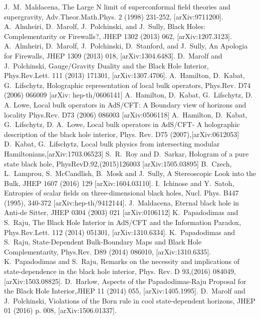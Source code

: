 \documentclass[11pt,a4paper]{article}
\begin{document}
\begin{thebibliography}{}
J.~M.~Maldacena, The Large N limit of superconformal field theories and supergravity, Adv.Theor.Math.Phys. 2 (1998) 231-252, [arXiv:9711200].
A.~Almheiri, D.~Marolf, J.~Polchinski, and J.~Sully, Black Holes: Complementarity or Firewalls?, JHEP 1302 (2013) 062, [arXiv:1207.3123].
A.~Almheiri, D.~Marolf, J.~Polchinski, D.~Stanford, and J.~Sully, An Apologia for Firewalls, JHEP 1309 (2013) 018, [arXiv:1304.6483].
D.~Marolf and J.~Polchinski, Gauge/Gravity Duality and the Black Hole Interior, Phys.Rev.Lett. 111 (2013) 171301, [arXiv:1307.4706].
A.~Hamilton, D.~Kabat, G.~Lifschytz, Holographic representation of local bulk operators, Phys.Rev. D74 (2006) 066009 [arXiv: hep-th/0606141]
 A.~Hamilton, D.~Kabat, G.~Lifschytz, D. A. Lowe, Local bulk operators in AdS/CFT: A Boundary view of horizons and locality Phys.Rev. D73 (2006) 086003 [arXiv:0506118]
A.~Hamilton, D.~Kabat, G.~Lifschytz, D. A.~Lowe, Local bulk operators in AdS/CFT- A holographic description of the black hole interior, Phys. Rev. D75 (2007),[arXiv:0612053]
D.~Kabat, G.~Lifschytz, Local bulk physics from intersecting modular Hamiltonians,[arXiv:1703.06523]
S.~R.~Roy and D.~Sarkar, Hologram of a pure state black hole, PhysRevD.92,(2015)126003 [arXiv:1505.03895]
B.~Czech, L.~Lamprou, S.~McCandlish, B.~Mosk and J.~Sully, A Stereoscopic Look into the Bulk, JHEP 1607 (2016) 129 [arXiv:1604.03110].
I.~Ichinose and Y.~Satoh, Entropies of scalar fields on three-dimensional black holes, Nucl. Phys. B447 (1995), 340-372 [arXiv:hep-th/9412144].
J.~Maldacena, Eternal black hole in Anti-de Sitter,
JHEP 0304 (2003) 021 [arXiv:0106112]
K.~Papadodimas and S.~Raju, The Black Hole Interior in AdS/CFT and the Information Paradox, Phys.Rev.Lett. 112 (2014) 051301, [arXiv:1310.6334].
K.~Papadodimas and S.~Raju, State-Dependent Bulk-Boundary Maps and Black Hole Complementarity, Phys.Rev. D89 (2014) 086010, [arXiv:1310.6335].
K.~Papadodimas and S.~Raju, Remarks on the necessity and implications of state-dependence in the black hole interior, Phys. Rev. D 93,(2016) 084049, [arXiv:1503.08825].
 D.~Harlow, Aspects of the Papadodimas-Raju Proposal for the Black Hole Interior,JHEP 11 (2014) 055, [arXiv:1405.1995].
D.~Marolf and J.~Polchinski, Violations of the Born rule in cool state-dependent horizons, JHEP 01 (2016) p. 008, [arXiv:1506.01337].

\end{thebibliography}
\end{document}
